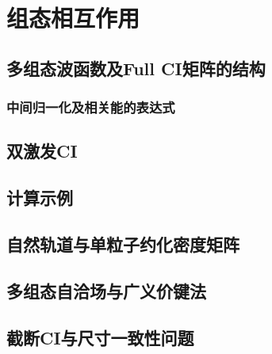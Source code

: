 \chapter{组态相互作用}
\section{多组态波函数及Full CI矩阵的结构}
\subsection{中间归一化及相关能的表达式}
\section{双激发CI}
\section{计算示例}
\section{自然轨道与单粒子约化密度矩阵}
\section{多组态自洽场与广义价键法}
\section{截断CI与尺寸一致性问题}